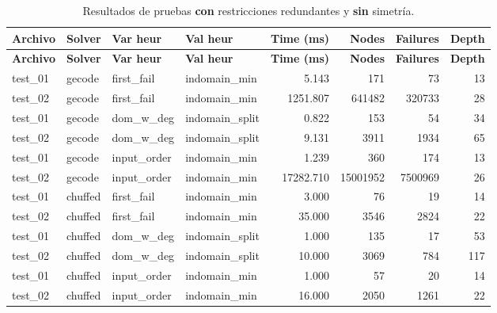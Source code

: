 \begin{longtable}{l l l l r r r r}
    \caption{Resultados de pruebas \textbf{con} restricciones redundantes y \textbf{sin} simetría.}\label{tab:pruebas-jobshop_mantenimiento-on-off}       \\
    \toprule
    \textbf{Archivo} & \textbf{Solver} & \textbf{Var heur} & \textbf{Val heur} & \textbf{Time (ms)} & \textbf{Nodes} & \textbf{Failures} & \textbf{Depth} \\
    \midrule
    \endfirsthead
    \toprule
    \textbf{Archivo} & \textbf{Solver} & \textbf{Var heur} & \textbf{Val heur} & \textbf{Time (ms)} & \textbf{Nodes} & \textbf{Failures} & \textbf{Depth} \\
    \midrule
    \endhead
    \bottomrule
    \endlastfoot

    test\_01         & gecode          & first\_fail       & indomain\_min     & 5.143              & 171            & 73                & 13             \\
    test\_02         & gecode          & first\_fail       & indomain\_min     & 1251.807           & 641482         & 320733            & 28             \\
    \midrule
    test\_01         & gecode          & dom\_w\_deg       & indomain\_split   & 0.822              & 153            & 54                & 34             \\
    test\_02         & gecode          & dom\_w\_deg       & indomain\_split   & 9.131              & 3911           & 1934              & 65             \\
    \midrule
    test\_01         & gecode          & input\_order      & indomain\_min     & 1.239              & 360            & 174               & 13             \\
    test\_02         & gecode          & input\_order      & indomain\_min     & 17282.710          & 15001952       & 7500969           & 26             \\
    \midrule
    test\_01         & chuffed         & first\_fail       & indomain\_min     & 3.000              & 76             & 19                & 14             \\
    test\_02         & chuffed         & first\_fail       & indomain\_min     & 35.000             & 3546           & 2824              & 22             \\
    \midrule
    test\_01         & chuffed         & dom\_w\_deg       & indomain\_split   & 1.000              & 135            & 17                & 53             \\
    test\_02         & chuffed         & dom\_w\_deg       & indomain\_split   & 10.000             & 3069           & 784               & 117            \\
    \midrule
    test\_01         & chuffed         & input\_order      & indomain\_min     & 1.000              & 57             & 20                & 14             \\
    test\_02         & chuffed         & input\_order      & indomain\_min     & 16.000             & 2050           & 1261              & 22             \\
\end{longtable}

